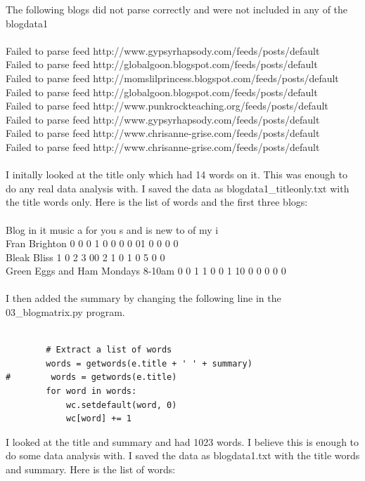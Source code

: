\documentclass[10pt,letterpaper]{article}
\begin{document}
The following blogs did not parse correctly and were not included in any of the blogdata1\\
\\
Failed to parse feed http://www.gypsyrhapsody.com/feeds/posts/default\\
Failed to parse feed http://globalgoon.blogspot.com/feeds/posts/default\\
Failed to parse feed http://momslilprincess.blogspot.com/feeds/posts/default\\
Failed to parse feed http://globalgoon.blogspot.com/feeds/posts/default\\
Failed to parse feed http://www.punkrockteaching.org/feeds/posts/default\\
Failed to parse feed http://www.gypsyrhapsody.com/feeds/posts/default\\
Failed to parse feed http://www.chrisanne-grise.com/feeds/posts/default\\
Failed to parse feed http://www.chrisanne-grise.com/feeds/posts/default\\
\\
I initally looked at the title only which had 14 words on it.  This was enough to do any real data analysis with.  I saved the data as blogdata1\_titleonly.txt with the title words only.  Here is the list of words and the first three blogs:\\
\\
Blog	in	it	music	a	for	you	s	and	is	new	to	of	my	i\\
Fran Brighton	0	0	0	1	0	0	0	0	01	0	0	0	0\\
Bleak Bliss	1	0	2	3	00	2	1	0	1	0	5	0	0\\
Green Eggs and Ham Mondays 8-10am	0	0	1	1	0	0	1	10	0	0	0	0	0\\
\\
I then added the summary by changing the following line in the 03\_blogmatrix.py program.\\
\\

\begin{lstlisting}
        # Extract a list of words
        words = getwords(e.title + ' ' + summary)
#        words = getwords(e.title)
        for word in words:
            wc.setdefault(word, 0)
            wc[word] += 1
\end{lstlisting}

I looked at the title and summary and had 1023 words.  I believe this is enough to do some data analysis with.  I saved the data as blogdata1.txt with the title words and summary.  Here is the list of words:\\
\end{document}
